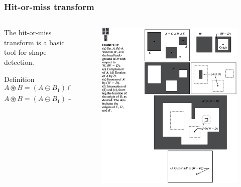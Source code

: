 \begin{frame}
\frametitle{Hit-or-miss transform}
\begin{columns}
\begin{column}{.5\textwidth}
The hit-or-miss transform is a basic tool for shape detection.
\begin{block}{Definition}
\[
A \circledast B = \left ( A \ominus B_{1}  \right ) \cap \left ( A^{c} \ominus B_{2} \right )
\]
\[
A \circledast B = \left ( A \ominus B_{1} \right ) - \left ( A \oplus \hat{B}_{2} \right )
\]
\end{block}
\end{column}
\begin{column}{.5\textwidth}
\begin{figure}[!h]
\includegraphics[width=\textwidth]{fig-9-12}
\end{figure}
\end{column}
\end{columns}
\end{frame}

